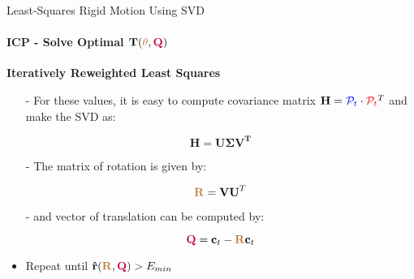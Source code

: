 \documentclass[aspectratio=169]{beamer}
\newcommand{\tikzRot}{0}
\newcommand{\tikzTrans}{(0,0)}
\newcommand{\tikzShowrobot}{0}
\newcommand{\tikzOneCenter}{0}
\begin{document}
\begin{frame}[fragile, c]{Least-Squares Rigid Motion Using SVD}
	\framesubtitle{ICP - Solve Optimal $\mathbf{T}(\textcolor{brown}{\theta}, \textcolor{purple}{\mathbf{Q}})$}
	\textbf{Iteratively Reweighted Least Squares}

	\begin{minipage}[t]{0.5\textwidth}
			\begin{figure}
				\resizebox{0.7\textwidth}{!}{
					\renewcommand{\tikzRot}{30}
					\renewcommand{\tikzTrans}{(8,0)}
					\renewcommand{\tikzShowrobot}{0}
					\renewcommand{\tikzOneCenter}{0}
					\resizebox{0.8\textwidth}{!}{
					}
				}
		\end{figure}
	\end{minipage}
	\begin{minipage}[t]{0.5\textwidth}

	\vspace{-0.2in}
	\begin{itemize}
		\item[-] For these values, it is easy to compute covariance matrix $\mathbf{H} = \textcolor{blue}{\mathcal{P}_{t}} \cdot \textcolor{red}{\mathcal{P}_{t}}^T $ and make the SVD as:

	\vspace{-0.2in}
	\begin{equation*}
		\mathbf{H} = \mathbf{U \Sigma V^T}
	\end{equation*}

	\item[-] The matrix of rotation is given by:

	\vspace{-0.2in}
	\begin{equation*}
		\textcolor{brown}{\mathbf{R}} = \mathbf{V U}^T
	\end{equation*}

	\item[-] and vector of translation can be computed by:

	\vspace{-0.2in}
	\begin{equation*}
		\textcolor{purple}{\mathbf{Q}} = {\mathbf{c}_{t}} - \textcolor{brown}{\mathbf{R}} {\mathbf{c}_{t}}
	\end{equation*}

	\item Repeat until $\mathbf{\hat{r}}(\textcolor{brown}{\mathbf{R}}, \textcolor{purple}{\mathbf{Q}}) > E_{min}$

	\end{itemize}
	\end{minipage}
\end{frame}
\end{document}
